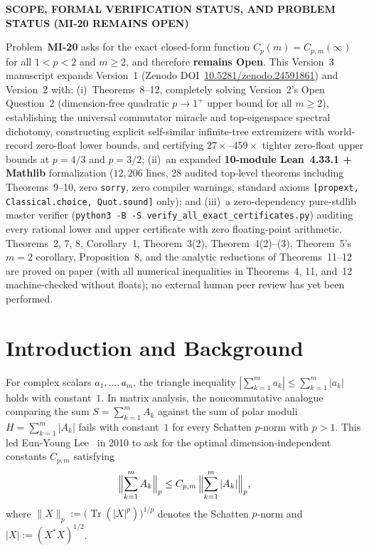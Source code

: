 \documentclass[10pt,letterpaper]{article}
\newcommand{\Tr}{\operatorname{Tr}}
\begin{document}
\begin{tcolorbox}[statusbox]
{\sffamily\footnotesize\bfseries\color{statusborder!90!black}SCOPE, FORMAL VERIFICATION STATUS, AND PROBLEM STATUS (MI-20 REMAINS OPEN)}\par\vspace{1.5pt}
{\small Problem~\textbf{MI-20} asks for the exact closed-form function $C_p(m) = C_{p,m}(\infty)$ for all $1 < p < 2$ and $m \ge 2$, and therefore \textbf{remains Open}. This Version~3 manuscript expands Version~1 (Zenodo DOI~\href{https://doi.org/10.5281/zenodo.24591861}{10.5281/zenodo.24591861}) and Version~2 with: (i)~Theorems~8--12, completely solving Version~2's Open Question~2 (dimension-free quadratic $p \to 1^+$ upper bound for all $m \ge 2$), establishing the universal commutator miracle and top-eigenspace spectral dichotomy, constructing explicit self-similar infinite-tree extremizers with world-record zero-float lower bounds, and certifying $27\times$--$459\times$ tighter zero-float upper bounds at $p = 4/3$ and $p = 3/2$; (ii)~an expanded \textbf{10-module Lean~4.33.1 + Mathlib} formalization ($12{,}206$ lines, 28 audited top-level theorems including Theorems~9--10, zero \texttt{sorry}, zero compiler warnings, standard axioms \texttt{[propext, Classical.choice, Quot.sound]} only); and (iii)~a zero-dependency pure-stdlib master verifier (\texttt{python3 -B -S verify\_all\_exact\_certificates.py}) auditing every rational lower and upper certificate with zero floating-point arithmetic. Theorems~2, 7, 8, Corollary~1, Theorem~3(2), Theorem~4(2)--(3), Theorem~5's $m=2$ corollary, Proposition~8, and the analytic reductions of Theorems~11--12 are proved on paper (with all numerical inequalities in Theorems~4, 11, and~12 machine-checked without floats); no external human peer review has yet been performed.}
\end{tcolorbox}

\section{Introduction and Background}

For complex scalars $a_1,\dots,a_m$, the triangle inequality $|\sum_{k=1}^m a_k| \le \sum_{k=1}^m |a_k|$ holds with constant~$1$. In matrix analysis, the noncommutative analogue comparing the sum $S = \sum_{k=1}^m A_k$ against the sum of polar moduli $H = \sum_{k=1}^m |A_k|$ fails with constant~$1$ for every Schatten $p$-norm with $p > 1$. This led Eun-Young Lee~\cite{Lee2010,Lee2011} in 2010 to ask for the optimal dimension-independent constants $C_{p,m}$ satisfying
\begin{equation}\label{eq:lee}
  \Bigl\|\sum_{k=1}^m A_k\Bigr\|_p \le C_{p,m}\,\Bigl\|\sum_{k=1}^m |A_k|\Bigr\|_p,
\end{equation}
where $\|X\|_p := \bigl(\Tr(|X|^p)\bigr)^{1/p}$ denotes the Schatten $p$-norm and $|X| := (X^* X)^{1/2}$.
\end{document}
